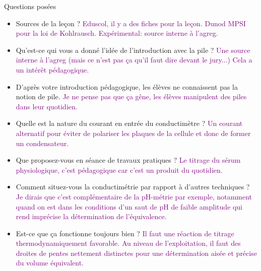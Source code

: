 \begin{reportBlock}{Questions posées}
\begin{itemize}
\item Sources de la leçon ? \textcolor{purple}{Eduscol, il y a des fiches pour la leçon. Dunod MPSI pour la loi de Kohlrausch. Expérimental: source interne à l'agreg.}

\item Qu'est-ce qui vous a donné l'idée de l'introduction avec la pile ?  \textcolor{purple}{Une source interne à l'agreg (mais ce n'est pas ça qu'il faut dire devant le jury...) Cela a un intérêt pédagogique.}

\item D'après votre introduction pédagogique, les élèves ne connaissent pas la notion de pile. \textcolor{purple}{Je ne pense pas que ça gêne, les élèves manipulent des piles dans leur quotidien.}

\item Quelle est la nature du courant en entrée du conductimètre ? \textcolor{purple}{Un courant alternatif pour éviter de polariser les plaques de la cellule et donc de former un condensateur.}

\item Que proposez-vous en séance de travaux pratiques ? \textcolor{purple}{Le titrage du sérum physiologique, c'est pédagogique car c'est un produit du quotidien.}

\item Comment situez-vous la conductimétrie par rapport à d'autres techniques ? \textcolor{purple}{Je dirais que c'est complémentaire de la pH-métrie par exemple, notamment quand on est dans les conditions d'un saut de pH de faible amplitude qui rend imprécise la détermination de l'équivalence.}

\item Est-ce que ça fonctionne toujours bien ? \textcolor{purple}{Il faut une réaction de titrage thermodynamiquement favorable. Au niveau de l'exploitation, il faut des droites de pentes nettement distinctes pour une détermination aisée et précise du volume équivalent.}

\end{itemize}


\end{reportBlock}


